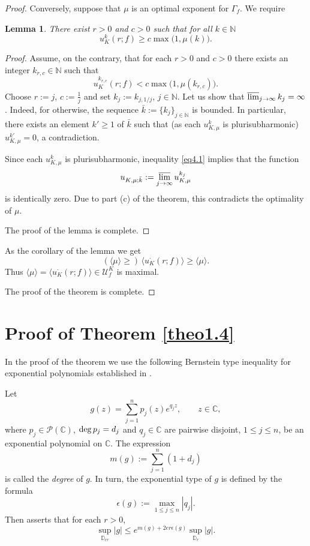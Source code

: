 \documentclass[11pt, oneside]{amsart}
\newtheorem{Lm}[Th]{Lemma}
\begin{document}
\begin{proof}
Conversely, suppose that $\mu$ is an optimal exponent for $\Gamma_f$. We require
\begin{Lm}\label{lemma4.1}
There exist $r>0$ and $c>0$ such that for all $k\in\mathbb N$
\[
u_K^k(r;f)\ge c\max\bigl(1,\mu(k)\bigr).
\]
\end{Lm}
\begin{proof}
Assume, on the contrary, that for each $r>0$ and $c>0$ there exists an integer $k_{r,c}\in\mathbb N$ such that
\begin{equation}\label{eq4.1}
u_K^{k_{r,c}}(r;f)< c\max\bigl(1,\mu(k_{r,c})\bigr).
\end{equation}
Choose $r:=j$, $c:=\frac 1j$ and set $k_{j}:=k_{j,1/j}$, $j\in\mathbb N$. Let us show that $\varlimsup_{j\rightarrow\infty} k_j=\infty$. Indeed, for otherwise, the sequence $\bar k:=\{k_j\}_{j\in\mathbb N}$ is bounded. In particular, there exists an element $k'\ge 1$ of $\bar k$ such that (as each $u_{K,\mu}^k$ is plurisubharmonic) $u_{K,\mu}^{k'}= 0$, a contradiction.

Since each $u_{K,\mu}^{k}$ is plurisubharmonic, inequality \eqref{eq4.1} implies that the function
\[
u_{K,\mu;\bar k}:=\varlimsup_{j\rightarrow\infty}u_{K,\mu}^{k_j}
\]
is identically zero. Due to part (c) of the theorem, this contradicts the optimality of $\mu$.

The proof of the lemma is complete.
\end{proof}
As the corollary of the lemma we get
\[
(\langle\mu\rangle\ge)\,\langle u_K^{\cdot}(r;f)\rangle\ge \langle\mu\rangle.
\]
Thus $\langle\mu\rangle=\langle u_K^{\cdot}(r;f)\rangle\in\mathscr U_f^K$ is maximal. 

The proof of the theorem is complete.
\end{proof}
\section{Proof of Theorem \ref{theo1.4}}
In the proof of the theorem we use the following Bernstein type inequality for exponential polynomials established in \cite{VP}.

Let
\[
g(z)=\sum_{j=1}^{n}p_j(z) e^{q_j z},\qquad z\in\mathbb C,
\]
where $p_j\in\mathcal P(\mathbb C)$,  ${\rm deg}\, p_j=d_j$ and $q_j\in \mathbb C$ are pairwise disjoint, $1\le j\le n$, be an exponential polynomial on $\mathbb C$. The expression
\[
m(g):=\sum_{j=1}^n (1+d_j)
\]
is called the {\em degree} of $g$. In turn, the exponential type of $g$ is defined by the
formula
\[
\epsilon(g):=\max_{1\le j\le n}|q_j|.
\]
Then \cite[p.\,27, Eq.\,(21)]{VP} asserts that for each $r>0$,
\begin{equation}\label{eq4.18}
\sup_{\mathbb D_{er}}|g|\le e^{m(g)+2er\epsilon(g)}\sup_{\mathbb D_r}|g|.
\end{equation}
\end{document}
